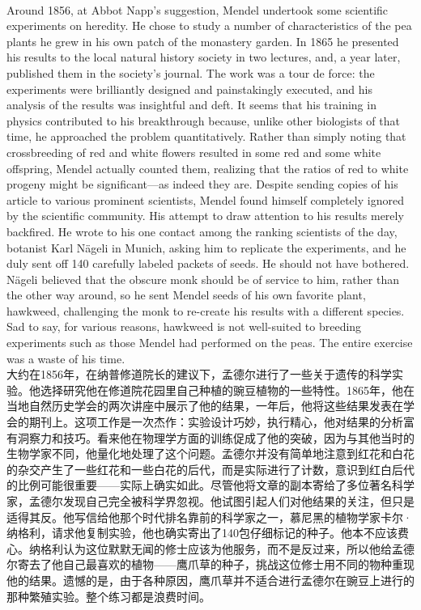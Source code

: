 \documentclass{article}
\begin{document}
\\
Around 1856, at Abbot Napp's suggestion, Mendel undertook some scientific experiments on heredity. He chose to study a number of characteristics of the pea plants he grew in his own patch of the monastery garden. In 1865 he presented his results to the local natural history society in two lectures, and, a year later, published them in the society's journal. The work was a tour de force: the experiments were brilliantly designed and painstakingly executed, and his analysis of the results was insightful and deft. It seems that his training in physics contributed to his breakthrough because, unlike other biologists of that time, he approached the problem quantitatively. Rather than simply noting that crossbreeding of red and white flowers resulted in some red and some white offspring, Mendel actually counted them, realizing that the ratios of red to white progeny might be significant—as indeed they are. Despite sending copies of his article to various prominent scientists, Mendel found himself completely ignored by the scientific community. His attempt to draw attention to his results merely backfired. He wrote to his one contact among the ranking scientists of the day, botanist Karl Nägeli in Munich, asking him to replicate the experiments, and he duly sent off 140 carefully labeled packets of seeds. He should not have bothered. Nägeli believed that the obscure monk should be of service to him, rather than the other way around, so he sent Mendel seeds of his own favorite plant, hawkweed, challenging the monk to re-create his results with a different species. Sad to say, for various reasons, hawkweed is not well-suited to breeding experiments such as those Mendel had performed on the peas. The entire exercise was a waste of his time.\\
大约在1856年，在纳普修道院长的建议下，孟德尔进行了一些关于遗传的科学实验。他选择研究他在修道院花园里自己种植的豌豆植物的一些特性。1865年，他在当地自然历史学会的两次讲座中展示了他的结果，一年后，他将这些结果发表在学会的期刊上。这项工作是一次杰作：实验设计巧妙，执行精心，他对结果的分析富有洞察力和技巧。看来他在物理学方面的训练促成了他的突破，因为与其他当时的生物学家不同，他量化地处理了这个问题。孟德尔并没有简单地注意到红花和白花的杂交产生了一些红花和一些白花的后代，而是实际进行了计数，意识到红白后代的比例可能很重要——实际上确实如此。尽管他将文章的副本寄给了多位著名科学家，孟德尔发现自己完全被科学界忽视。他试图引起人们对他结果的关注，但只是适得其反。他写信给他那个时代排名靠前的科学家之一，慕尼黑的植物学家卡尔·纳格利，请求他复制实验，他也确实寄出了140包仔细标记的种子。他本不应该费心。纳格利认为这位默默无闻的修士应该为他服务，而不是反过来，所以他给孟德尔寄去了他自己最喜欢的植物——鹰爪草的种子，挑战这位修士用不同的物种重现他的结果。遗憾的是，由于各种原因，鹰爪草并不适合进行孟德尔在豌豆上进行的那种繁殖实验。整个练习都是浪费时间。\\
\end{document}
